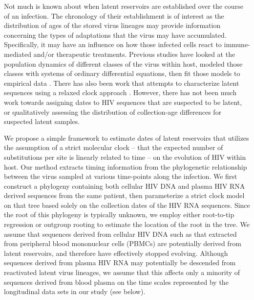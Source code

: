 Not much is known about when latent reservoirs are established over the course of an infection. 
The chronology of their establishment is of interest as the distribution of ages of the stored virus lineages may provide information concerning the types of adaptations that the virus may have accumulated. 
Specifically, it may have an influence on how those infected cells react to immune-mediated and/or therapeutic treatments. 
Previous studies have looked at the population dynamics of different classes of the virus within host, modeled those classes with systems of ordinary differential equations, then fit those models to empirical data \citep{Althaus14}. 
There has also been work that attempts to characterize latent sequences using a relaxed clock approach \citep{Immonen14}. 
However, there has not been much work towards assigning dates to HIV sequences that are suspected to be latent, or qualitatively assessing the distribution of collection-age differences for suspected latent samples.

We propose a simple framework to estimate dates of latent reservoirs that utilizes the assumption of a strict molecular clock -- that the expected number of substitutions per site is linearly related to time \citep{Ho14} --  on the evolution of HIV within host. 
Our method extracts timing information from the phylogenetic relationship between the virus sampled at various time-points along the infection. 
We first construct a phylogeny containing both cellular HIV DNA and plasma HIV RNA derived sequences from the same patient, then parameterize a strict clock model on that tree based solely on the collection dates of the HIV RNA sequences. 
Since the root of this phylogeny is typically unknown, we employ either root-to-tip regression \citep{Korber00} or outgroup rooting to estimate the location of the root in the tree. 
We assume that sequences derived from cellular HIV DNA such as that extracted from peripheral blood mononuclear cells (PBMCs) are potentially derived from latent reservoirs, and  therefore have effectively stopped evolving.
Although sequences derived from plasma HIV RNA may potentially be descended from reactivated latent virus lineages, we assume that this affects only a minority of sequences derived from blood plasma on the time scales represented by the longitudinal data sets in our study (see below).

